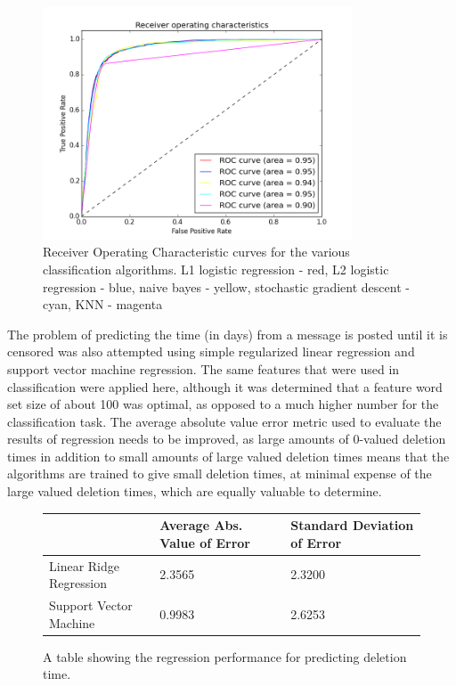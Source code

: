\documentclass{article} %
\begin{document}
\begin{CJK*}{UTF8}{gbsn}
\begin{figure}[!htb]
	\begin{center}
	\includegraphics[width=0.82\textwidth, height = 0.4\textheight]{./data/ROC_Curve}
	\end{center}
\caption{Receiver Operating Characteristic curves for the various classification algorithms. L1 logistic regression - red, L2 logistic regression - blue, naive bayes - yellow, stochastic gradient descent - cyan, KNN - magenta}
\vspace{-10pt}
\end{figure}

The problem of predicting the time (in days) from a message is posted until it is censored was also attempted using simple regularized linear regression and support vector machine regression. The same features that were used in classification were applied here, although it was determined that a feature word set size of about 100 was optimal, as opposed to a much higher number for the classification task. The average absolute value error metric used to evaluate the results of regression needs to be improved, as large amounts of 0-valued deletion times in addition to small amounts of large valued deletion times means that the algorithms are trained to give small deletion times, at minimal expense of the large valued deletion times, which are equally valuable to determine. 

\begin{figure}[!htb]
	\begin{center}
		    \begin{tabular}{ |l | l | l |}
		    \hline
		    & Average Abs. Value of Error & Standard Deviation of Error \\\hline
		    Linear Ridge Regression & 2.3565 & 2.3200 \\\hline
		    Support Vector Machine & 0.9983 & 2.6253 \\ \hline
		    \end{tabular}
	\end{center}
\caption{A table showing the regression performance for predicting deletion time.}
\vspace{-10pt}
\end{figure}


\end{CJK*}
\end{document}

